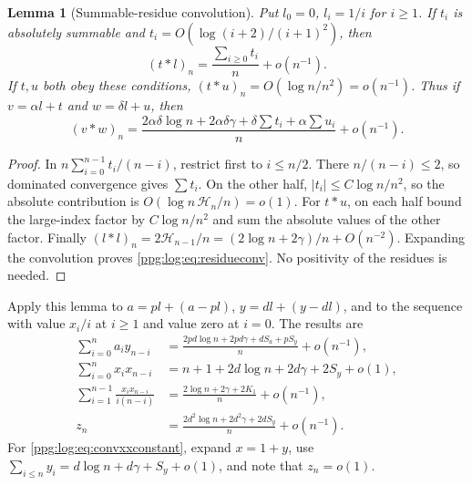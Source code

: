 \documentclass[11pt,letterpaper]{article}
\newtheorem{lemma}[theorem]{Lemma}
\theoremstyle{remark}\newtheorem{remark}[theorem]{Remark}
\numberwithin{equation}{section}
\newcommand{\HH}{\mathcal H}
\begin{document}
\begin{lemma}[Summable-residue convolution]\label{ppg:log:lem:residueconv}
Put $l_0=0$, $l_i=1/i$ for $i\ge1$. If $t_i$ is absolutely summable and $t_i=O(\log(i+2)/(i+1)^2)$, then
\[
 (t*l)_n=\frac{\sum_{i\ge0}t_i}{n}+o(n^{-1}).
\]
If $t,u$ both obey these conditions, $(t*u)_n=O(\log n/n^2)=o(n^{-1})$. Thus if $v=\alpha l+t$ and $w=\delta l+u$, then
\begin{equation}\label{ppg:log:eq:residueconv}
 (v*w)_n=\frac{2\alpha\delta\log n+2\alpha\delta\gamma
                    +\delta\sum t_i+\alpha\sum u_i}{n}+o(n^{-1}).
\end{equation}
\end{lemma}
\begin{proof}
In $n\sum_{i=0}^{n-1}t_i/(n-i)$, restrict first to $i\le n/2$. There $n/(n-i)\le2$, so dominated convergence gives $\sum t_i$. On the other half, $|t_i|\le C\log n/n^2$, so the absolute contribution is $O(\log n\,\HH_n/n)=o(1)$. For $t*u$, on each half bound the large-index factor by $C\log n/n^2$ and sum the absolute values of the other factor. Finally $(l*l)_n=2\HH_{n-1}/n=(2\log n+2\gamma)/n+O(n^{-2})$. Expanding the convolution proves \eqref{ppg:log:eq:residueconv}. No positivity of the residues is needed.
\end{proof}

Apply this lemma to $a=pl+(a-pl)$, $y=dl+(y-dl)$, and to the sequence with value $x_i/i$ at $i\ge1$ and value zero at $i=0$. The results are
\begin{align}
 \sum_{i=0}^na_iy_{n-i}
 &=\frac{2pd\log n+2pd\gamma+dS_a+pS_y}{n}+o(n^{-1}),\label{ppg:log:eq:convayconstant}\\
 \sum_{i=0}^nx_ix_{n-i}
 &=n+1+2d\log n+2d\gamma+2S_y+o(1),\label{ppg:log:eq:convxxconstant}\\
 \sum_{i=1}^{n-1}\frac{x_ix_{n-i}}{i(n-i)}
 &=\frac{2\log n+2\gamma+2K_1}{n}+o(n^{-1}),\label{ppg:log:eq:convxxweightedconstant}\\
 z_n&=\frac{2d^2\log n+2d^2\gamma+2dS_y}{n}+o(n^{-1}).\label{ppg:log:eq:convyconstant}
\end{align}
For \eqref{ppg:log:eq:convxxconstant}, expand $x=1+y$, use $\sum_{i\le n}y_i=d\log n+d\gamma+S_y+o(1)$, and note that $z_n=o(1)$.
\end{document}
